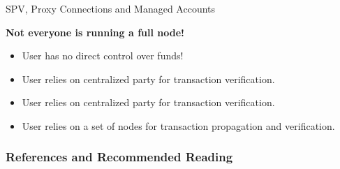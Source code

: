 \documentclass[handout]{beamer}
\begin{document}
\begin{frame}{SPV, Proxy Connections and Managed Accounts}

\color{focus} \textbf{Not everyone is running a full node!} \color{black} \\ \vspace{1em}

	
	\begin{itemize}
		\item<2-> User has no direct control over funds!
		\item<3-> User relies on centralized party for transaction verification.
	\end{itemize}

	\vspace{1em}	
		
		
		\begin{itemize}
		\item<5-> User relies on centralized party for transaction verification.
	\end{itemize}		
	
	\vspace{1em}
	
	
	\begin{itemize}
		\item<7-> User relies on a set of nodes for transaction propagation and verification.

	\end{itemize}
	

	
\end{frame}



\begin{frame}%
\frametitle{References and Recommended Reading}
	
	
\end{frame}
\end{document}
